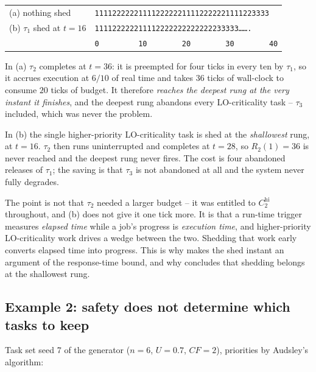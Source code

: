 \begin{center}
\begin{tabular}{ll}
\toprule
(a) nothing shed & \texttt{1111222222111122222211112222221111223333} \\
(b) $\tau_1$ shed at $t = 16$ & \texttt{111122222211112222222222222233333\ldots\ldots.} \\
 & \texttt{0~~~~~~~~~10~~~~~~~~20~~~~~~~~30~~~~~~~~40} \\
\bottomrule
\end{tabular}
\end{center}

\noindent In (a) $\tau_2$ completes at $t = 36$: it is preempted for four ticks
in every ten by $\tau_1$, so it accrues execution at $6/10$ of real time and
takes $36$ ticks of wall-clock to consume $20$ ticks of budget. It therefore
\emph{reaches the deepest rung at the very instant it finishes}, and the
deepest rung abandons every LO-criticality task -- $\tau_3$ included, which was
never the problem.

In (b) the single higher-priority LO-criticality task is shed at the
\emph{shallowest} rung, at $t = 16$. $\tau_2$ then runs uninterrupted and
completes at $t = 28$, so $R_2(1) = 36$ is never reached and the deepest rung
never fires. The cost is four abandoned releases of $\tau_1$; the saving is
that $\tau_3$ is not abandoned at all and the system never fully degrades.

The point is not that $\tau_2$ needed a larger budget -- it was entitled to
$C_2^{\mathrm{hi}}$ throughout, and (b) does not give it one tick more. It is
that a run-time trigger measures \emph{elapsed time} while a job's progress is
\emph{execution time}, and higher-priority LO-criticality work drives a wedge
between the two. Shedding that work early converts elapsed time into progress.
This is why  makes the shed instant an argument of the
response-time bound, and why  concludes that shedding
belongs at the shallowest rung.

\subsection{Example 2: safety does not determine which tasks to keep}
\label{sec:ex-order}

Task set seed 7 of the generator ($n = 6$, $U = 0.7$, $CF = 2$), priorities by
Audsley's algorithm:

